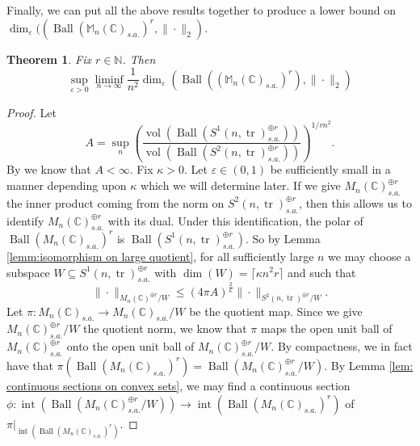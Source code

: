 \documentclass[10pt]{amsart}
\newtheorem{thm}{Theorem}[section]
\theoremstyle{definition}
\numberwithin{equation}{section}
\newcommand{\bC}{{\mathbb C}}
\newcommand{\bM}{{\mathbb M}}
\newcommand{\bN}{{\mathbb N}}
\DeclareMathOperator{\tr}{tr}
\DeclareMathOperator{\vol}{vol}
\DeclareMathOperator{\Int}{int}
\DeclareMathOperator{\Ball}{Ball}
\begin{document}
Finally, we can put all the above results together to produce a lower bound on $\dim_{\varepsilon}((\Ball(\bM_{n}(\bC)_{s.a.})^{r},\|\cdot\|_{2})$.

\begin{thm}\label{thm:computation of dim for op norm vs 2-norm}
Fix $r\in \bN$. Then
\[\sup_{\varepsilon>0}\liminf_{n\to\infty}\frac{1}{n^{2}}\dim_{\varepsilon}(\Ball((\bM_{n}(\bC)_{s.a.})^{r}),\|\cdot\|_{2})\]

\end{thm}

\begin{proof}
Let
\[A=\sup_{n}\left(\frac{\vol(\Ball(S^{1}(n,\tr)_{s.a.}^{\oplus r}))}{\vol(\Ball(S^{2}(n,\tr)_{s.a.}^{\oplus r}))}\right)^{1/rn^{2}}.\]
By \cite[Corollaire 8]{SPVolumes} we know that $A<\infty$.
Fix $\kappa>0$. 
Let $\varepsilon\in (0,1)$ be sufficiently small in a manner depending upon $\kappa$ which we will determine later. 
If we give $M_{n}(\bC)_{s.a.}^{\oplus r}$ the inner product coming from the norm on $S^{2}(n,\tr)_{s.a.}^{\oplus r}$, then this allows us to identify $M_{n}(\bC)_{s.a.}^{\oplus r}$  with its dual. 
Under this identification, the polar of $\Ball(M_{n}(\bC)_{s.a.})^{r}$ is $\Ball(S^{1}(n,\tr)_{s.a.}^{\oplus r})$.
So by Lemma \ref{lemm:isomorphism on large quotient}, for all sufficiently large $n$ we may choose a subspace $W\subseteq S^{1}(n,\tr)_{s.a.}^{\oplus r}$ with $\dim(W)=\lceil{\kappa n^{2}r\rceil}$ and such that 
\[\|\cdot\|_{M_{n}(\bC)^{\oplus r}/W}\leq \left(4\pi A\right)^{\frac{2}{\kappa}}\|\cdot\|_{S^{2}(n,\tr)^{\oplus r}/W}.\]
Let $\pi\colon M_{n}(\bC)_{s.a.}\to M_{n}(\bC)_{s.a.}/W$ be the quotient map.
Since we give $M_{n}(\bC)_{s.a.}^{\oplus r}/W$ the quotient norm, we know that $\pi$ maps the open unit ball of $M_{n}(\bC)_{s.a.}^{\oplus r}$ onto the open unit ball of $M_{n}(\bC)_{s.a.}^{\oplus r}/W$. By compactness, we in fact have that $\pi(\Ball(M_{n}(\bC)_{s.a.})^{r})=\Ball(M_{n}(\bC)_{s.a.}^{\oplus r}/W)$. By Lemma \ref{lem: continuous sections on convex sets}, we may find a continuous section $\phi\colon \Int(\Ball(M_{n}(\bC)_{s.a.}^{\oplus r}/W))\to \Int(\Ball(M_{n}(\bC)_{s.a.})^{r})$ of $\pi\big|_{\Int(\Ball(M_{n}(\bC)_{s.a.})^{r})}$.


\end{proof}
\end{document}
